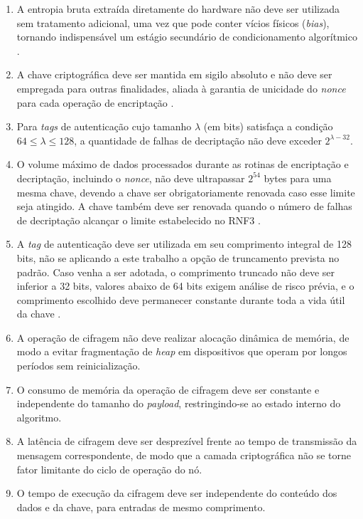 \begin{enumerate}
    \item[RNF1.] A entropia bruta extraída diretamente do hardware não deve ser utilizada sem tratamento adicional, uma vez que pode conter vícios físicos (\textit{bias}), tornando indispensável um estágio secundário de condicionamento algorítmico \cite{turan2018nist90b}.

    \item[RNF2.] A chave criptográfica deve ser mantida em sigilo absoluto e não deve ser empregada para outras finalidades, aliada à garantia de unicidade do \textit{nonce} para cada operação de encriptação \cite{nist800232}.

    \item[RNF3.] Para \textit{tags} de autenticação cujo tamanho $\lambda$ (em bits) satisfaça a condição $64 \leq \lambda \leq 128$, a quantidade de falhas de decriptação não deve exceder $2^{\lambda - 32}$.

    \item[RNF4.] O volume máximo de dados processados durante as rotinas de encriptação e decriptação, incluindo o \textit{nonce}, não deve ultrapassar $2^{54}$ bytes para uma mesma chave, devendo a chave ser obrigatoriamente renovada caso esse limite seja atingido. A chave também deve ser renovada quando o número de falhas de decriptação alcançar o limite estabelecido no RNF3 \cite{nist800232}.

    \item[RNF5.] A \textit{tag} de autenticação deve ser utilizada em seu comprimento integral de 128 bits, não se aplicando a este trabalho a opção de truncamento prevista no padrão. Caso venha a ser adotada, o comprimento truncado não deve ser inferior a 32 bits, valores abaixo de 64 bits exigem análise de risco prévia, e o comprimento escolhido deve permanecer constante durante toda a vida útil da chave \cite{nist800232}.

    \item[RNF6.] A operação de cifragem não deve realizar alocação dinâmica de memória, de modo a evitar fragmentação de \textit{heap} em dispositivos que operam por longos períodos sem reinicialização.

    \item[RNF7.] O consumo de memória da operação de cifragem deve ser constante e independente do tamanho do \textit{payload}, restringindo-se ao estado interno do algoritmo.

    \item[RNF8.] A latência de cifragem deve ser desprezível frente ao tempo de transmissão da mensagem correspondente, de modo que a camada criptográfica não se torne fator limitante do ciclo de operação do nó.

    \item[RNF9.] O tempo de execução da cifragem deve ser independente do conteúdo dos dados e da chave, para entradas de mesmo comprimento.
\end{enumerate}

